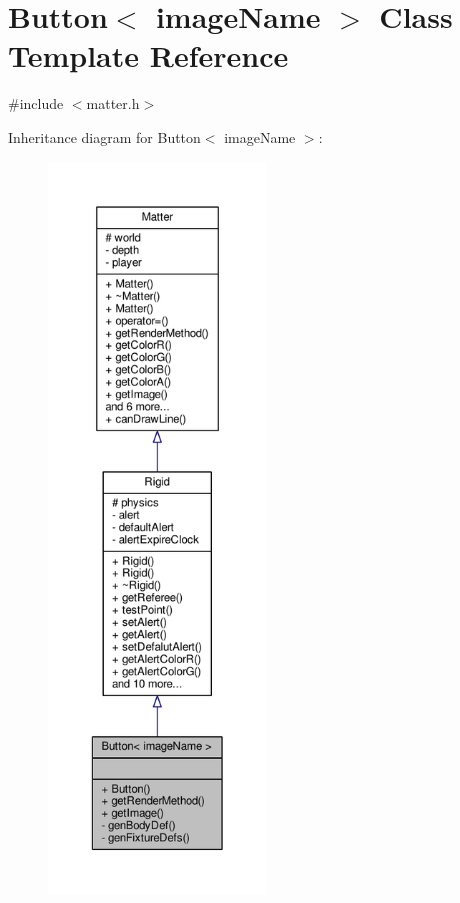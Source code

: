 \hypertarget{classButton}{}\section{Button$<$ image\+Name $>$ Class Template Reference}
\label{classButton}


{\ttfamily \#include $<$matter.\+h$>$}



Inheritance diagram for Button$<$ image\+Name $>$\+:
\nopagebreak
\begin{figure}[H]
\begin{center}
\leavevmode
\includegraphics[height=550pt]{classButton__inherit__graph}
\end{center}
\end{figure}


